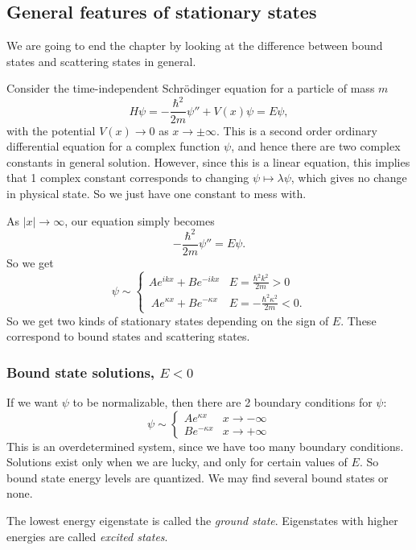 \documentclass[a4paper]{article}
\begin{document}
\subsection{General features of stationary states}
We are going to end the chapter by looking at the difference between bound states and scattering states in general.

Consider the time-independent Schr\"odinger equation for a particle of mass $m$
\[
H\psi = -\frac{\hbar^2}{2m}\psi'' + V(x) \psi = E\psi,
\]
with the potential $V(x) \to 0$ as $x \to \pm \infty$. This is a second order ordinary differential equation for a complex function $\psi$, and hence there are two complex constants in general solution. However, since this is a linear equation, this implies that 1 complex constant corresponds to changing $\psi \mapsto \lambda \psi$, which gives no change in physical state. So we just have one constant to mess with.

As $|x| \to \infty$, our equation simply becomes
\[
-\frac{\hbar^2}{2m} \psi'' = E\psi.
\]
So we get
\[
\psi \sim
\begin{cases}
Ae^{ikx} + Be^{-ikx} & E = \frac{\hbar^2 k^2}{2m} > 0\\\
Ae^{\kappa x} + Be^{-\kappa x} & E = -\frac{\hbar^2 \kappa^2}{2m} < 0.
\end{cases}
\]
So we get two kinds of stationary states depending on the sign of $E$. These correspond to bound states and scattering states.

\subsubsection*{Bound state solutions, \texorpdfstring{$E < 0$}{E }}
If we want $\psi$ to be normalizable, then there are 2 boundary conditions for $\psi$:
\[
\psi \sim
\begin{cases}
Ae^{\kappa x} & x \to -\infty\\
B e^{-\kappa x} & x \to +\infty
\end{cases}
\]
This is an overdetermined system, since we have too many boundary conditions. Solutions exist only when we are lucky, and only for certain values of $E$. So bound state energy levels are quantized. We may find several bound states or none.

\begin{defi}
	The lowest energy eigenstate is called the \emph{ground state}. Eigenstates with higher energies are called \emph{excited states}.
\end{defi}
\end{document}
